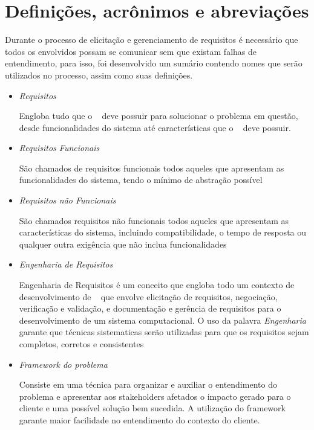 \section{Definições, acrônimos e abreviações}

Durante o processo de elicitação e gerenciamento de requisitos é necessário que todos os envolvidos possam se comunicar sem que existam falhas de entendimento, para isso, foi desenvolvido um sumário contendo nomes que serão utilizados no processo, assim como suas definições.

\begin{itemize}

	\item \textit{Requisitos} 

		Engloba tudo que o \sw~ deve possuir para solucionar o problema em questão, desde funcionalidades do sistema até características que o \sw~ deve possuir.

	\item \textit{Requisitos Funcionais}

		São chamados de requisitos funcionais todos aqueles que apresentam as funcionalidades do sistema, tendo o mínimo de abstração possível %

	\item \textit{Requisitos não Funcionais}

		São chamados requisitos não funcionais todos aqueles que apresentam as características do sistema, incluindo compatibilidade, o tempo de resposta ou qualquer outra exigência que não inclua funcionalidades %

	\item \textit{Engenharia de Requisitos}

		Engenharia de Requisitos é um conceito que engloba todo um contexto de desenvolvimento de \sw~ que envolve elicitação de requisitos, negociação, verificação e validação, e documentação e gerência de requisitos para o desenvolvimento de um sistema computacional. O uso da palavra \textit{Engenharia} garante que técnicas sistematicas serão utilizadas para que os requisitos sejam completos, corretos e consistentes %

	\item \textit{Framework do problema}

		Consiste em uma técnica para organizar e auxiliar o entendimento do problema e apresentar aos stakeholders afetados o impacto gerado para o cliente e uma possível solução bem sucedida. A utilização do framework garante maior facilidade no entendimento do contexto do cliente.


\end{itemize}
